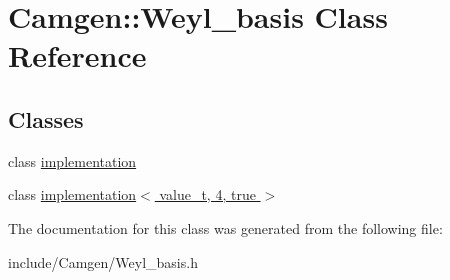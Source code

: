 \hypertarget{a00577}{\section{Camgen\-:\-:Weyl\-\_\-basis Class Reference}
\label{a00577}
}
\subsection*{Classes}
\begin{DoxyCompactItemize}
\item 
class \hyperlink{a00289}{implementation}
\item 
class \hyperlink{a00301}{implementation$<$ value\-\_\-t, 4, true $>$}
\end{DoxyCompactItemize}


The documentation for this class was generated from the following file\-:\begin{DoxyCompactItemize}
\item 
include/\-Camgen/Weyl\-\_\-basis.\-h\end{DoxyCompactItemize}
